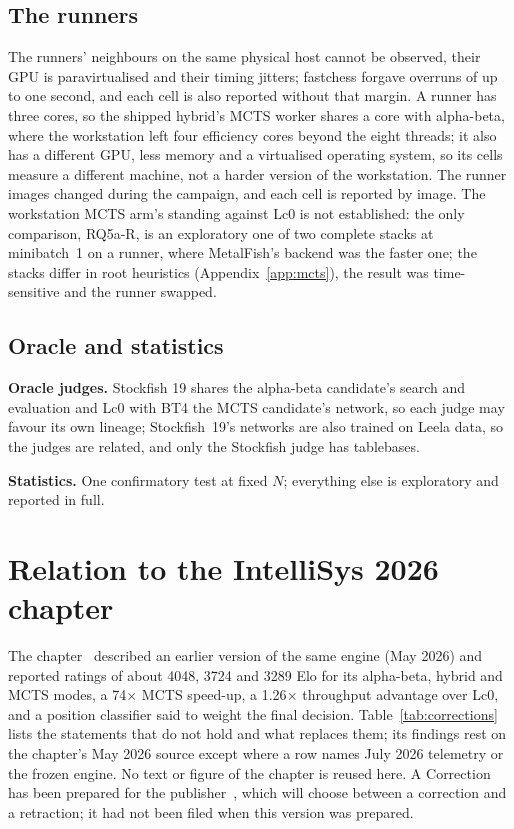 \documentclass{article}
\newif\ifanon
\newcommand{\MF}{MetalFish}
\begin{document}
\subsection{The runners}
The runners' neighbours on the same physical host cannot be observed, their GPU is paravirtualised and their timing jitters; fastchess forgave overruns of up to one second, and each cell is also reported without that margin. A runner has three cores, so the shipped hybrid's MCTS worker shares a core with alpha-beta, where the workstation left four efficiency cores beyond the eight threads; it also has a different GPU, less memory and a virtualised operating system, so its cells measure a different machine, not a harder version of the workstation. The runner images changed during the campaign, and each cell is reported by image. The workstation MCTS arm's standing against Lc0 is not established: the only comparison, RQ5a-R, is an exploratory one of two complete stacks at minibatch~1 on a runner, where \MF{}'s backend was the faster one; the stacks differ in root heuristics (Appendix~\ref{app:mcts}), the result was time-sensitive and the runner swapped.

\subsection{Oracle and statistics}
\textbf{Oracle judges.} Stockfish 19 shares the alpha-beta candidate's search and evaluation and Lc0 with BT4 the MCTS candidate's network, so each judge may favour its own lineage; Stockfish~19's networks are also trained on Leela data, so the judges are related, and only the Stockfish judge has tablebases.

\textbf{Statistics.} One confirmatory test at fixed $N$; everything else is exploratory and reported in full.

\section{Relation to the IntelliSys 2026 chapter}
\label{sec:chapter}
The chapter~\cite{niketan2026chapter} described an earlier version of the same engine (May 2026) and reported ratings of about 4048, 3724 and 3289 Elo for its alpha-beta, hybrid and MCTS modes, a 74$\times$ MCTS speed-up, a 1.26$\times$ throughput advantage over Lc0, and a position classifier said to weight the final decision. Table~\ref{tab:corrections} lists the statements that do not hold and what replaces them; its findings rest on the chapter's May 2026 source except where a row names July 2026 telemetry or the frozen engine. No text or figure of the chapter is reused here.\ifanon\else{} A Correction has been prepared for the publisher~\cite{correction}, which will choose between a correction and a retraction; it had not been filed when this version was prepared.\fi
\end{document}
